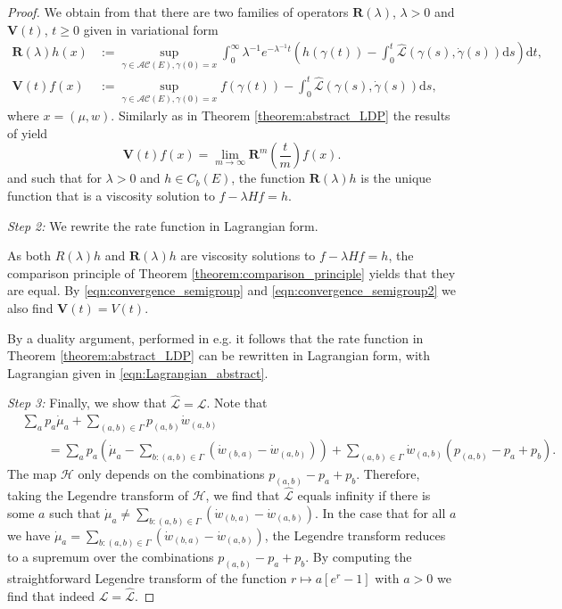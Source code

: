 \documentclass[a4paper]{article}
\newcommand{\cA}{\mathcal{A}}
\newcommand{\cC}{\mathcal{C}}
\newcommand{\cH}{\mathcal{H}}
\newcommand{\cL}{\mathcal{L}}
\newcommand{\bfR}{\mathbf{R}}
\newcommand{\bfV}{\mathbf{V}}
\newcommand{\dd}{ \mathrm{d}}
\numberwithin{equation}{section}
\theoremstyle{definition}
\begin{document}
\begin{proof}
	We obtain from \cite[Theorem 8.27]{FK06}  that there are two families of operators $\bfR(\lambda)$, $\lambda > 0$ and $\bfV(t)$, $t \geq 0$ given in variational form 
	\begin{align*}
		\bfR(\lambda)h(x) & := \sup_{\gamma \in \cA\cC(E), \gamma(0) = x} \int_0^\infty \lambda^{-1} e^{-\lambda^{-1}t} \left(h(\gamma(t)) - \int_0^t \widehat{\cL}(\gamma(s),\dot{\gamma}(s)) \dd s \right) \dd t, \\
		\bfV(t)f(x) &  := \sup_{\gamma \in \cA\cC(E), \gamma(0) = x} f(\gamma(t)) - \int_0^t \widehat{\cL}(\gamma(s),\dot{\gamma}(s)) \dd s,
	\end{align*}
	where $x = (\mu,w)$. Similarly as in Theorem \ref{theorem:abstract_LDP} the results of \cite[Theorem 8.27 and Section 8]{FK06} yield
	\begin{equation} \label{eqn:convergence_semigroup2}
		\bfV(t)f(x) = \lim_{m \rightarrow \infty} \bfR^m\left(\frac{t}{m}\right) f(x).
	\end{equation}
	and such that for $\lambda > 0$ and $h \in C_b(E)$, the function $\bfR(\lambda)h$ is the unique function that is a viscosity solution to $f - \lambda H f = h$. 
	
	\smallskip
	
	\textit{Step 2:} We rewrite the rate function in Lagrangian form.
	
	As both $R(\lambda)h$ and $\bfR(\lambda)h$ are viscosity solutions to $f - \lambda Hf = h$, the comparison principle of Theorem \ref{theorem:comparison_principle} yields that they are equal. By \eqref{eqn:convergence_semigroup} and \eqref{eqn:convergence_semigroup2} we also find $\bfV(t) = V(t)$.
	
	By a duality argument, performed in e.g. \cite[Theorem 8.14]{FK06} it follows that the rate function in Theorem \ref{theorem:abstract_LDP} can be rewritten in Lagrangian form, with Lagrangian given in \eqref{eqn:Lagrangian_abstract}. 
	
	\smallskip
	
	\textit{Step 3:} Finally, we show that $\widehat{\cL} = \cL$. Note that
	\begin{align*}
		& \sum_a p_a \dot{\mu}_a + \sum_{(a,b) \in \Gamma} p_{(a,b)}  \dot{w}_{(a,b)} \\
		& \qquad = \sum_{a} p_a \left(\dot{\mu}_a - \sum_{b: (a,b) \in \Gamma} \left(\dot{w}_{(b,a)} - \dot{w}_{(a,b)}\right)\right) + \sum_{(a,b) \in \Gamma} \dot{w}_{(a,b)}\left(p_{(a,b)} - p_a + p_b\right).
	\end{align*}
	The map $\cH$ only depends on the combinations $p_{(a,b)} - p_a + p_b$. Therefore, taking the Legendre transform of $\cH$, we find that $\widehat{\cL}$ equals infinity if there is some $a$ such that $\dot{\mu}_a \neq \sum_{b: (a,b) \in \Gamma} \left(\dot{w}_{(b,a)} - \dot{w}_{(a,b)}\right)$. In the case that for all $a$ we have $\dot{\mu}_a = \sum_{b: (a,b) \in \Gamma} \left(\dot{w}_{(b,a)} - \dot{w}_{(a,b)}\right)$, the Legendre transform reduces to a supremum over the combinations $p_{(a,b)} - p_a + p_b$. By computing the straightforward Legendre transform of the function $r \mapsto a \left[e^r -1\right]$ with $a > 0$ we find that indeed $\cL = \widehat{\cL}$.
	

\end{proof}
\end{document}
